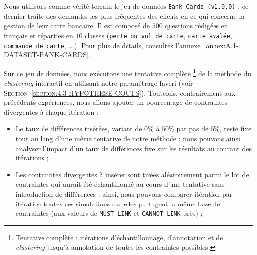 			Nous utilisons comme vérité terrain le jeu de données \texttt{Bank Cards (v1.0.0)} : ce dernier traite des demandes les plus fréquentes des clients en ce qui concerne la gestion de leur carte bancaire.
			Il est composé de $500$ questions rédigées en français et réparties en $10$ classes (\texttt{perte ou vol de carte}, \texttt{carte avalée}, \texttt{commande de carte}, ...).
			Pour plus de détails, consultez l'annexe~\ref{annex:A.1-DATASET-BANK-CARDS}.
			
			Sur ce jeu de données, nous exécutons une tentative complète
			\footnote{Tentative complète : itérations d'échantillonnage, d'annotation et de \textit{clustering} jusqu'à annotation de toutes les contraintes possibles.}
			de la méthode du \textit{clustering} interactif en utilisant notre paramétrage favori (voir \textsc{Section~\ref{section:4.3-HYPOTHESE-COUTS}}).
			Toutefois, contrairement aux précédents expériences, nous allons ajouter un pourcentage de contraintes divergentes à chaque itération :
			\begin{itemize}
				\item Le taux de différences insérées, variant de $0$\% à $50$\% par pas de $5$\%, reste fixe tout au long d'une même tentative de notre méthode : nous pouvons ainsi analyser l'impact d'un taux de différences fixe sur les résultats au courant des itérations ;
				\item Les contraintes divergentes à insérer sont tirées aléatoirement parmi le lot de contraintes qui aurait été échantillonné au cours d'une tentative sans introduction de différences : ainsi, nous pouvons comparer itération par itération toutes ces simulations car elles partagent la même base de contraintes (aux valeurs de \texttt{MUST-LINK} et \texttt{CANNOT-LINK} près) ;
			\end{itemize}
			
